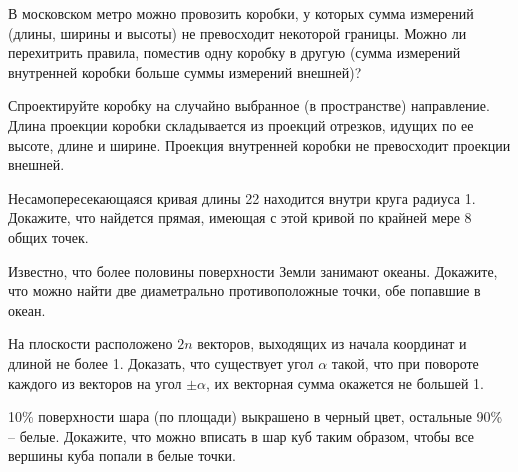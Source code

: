 \begin{problem}
В московском метро можно провозить коробки, у которых сумма измерений (длины, ширины и высоты) не превосходит некоторой границы. Можно ли перехитрить правила, поместив одну коробку в другую (сумма измерений внутренней коробки больше суммы измерений внешней)?
\end{problem}
\begin{ordre}
Спроектируйте коробку на случайно выбранное (в пространстве) 
направление. Длина проекции коробки складывается из проекций отрезков, 
идущих по ее высоте, длине и ширине. Проекция внутренней коробки не 
превосходит проекции внешней.
\end{ordre}

\begin{problem}
Несамопересекающаяся кривая длины 22 находится внутри круга радиуса 1. Докажите, что найдется прямая, имеющая с этой кривой по крайней мере 8 общих точек.
\end{problem}
\begin{problem}
Известно, что более половины поверхности Земли занимают океаны. Докажите, что можно найти две диаметрально противоположные точки, обе попавшие в океан.
\end{problem}


\begin{problem}
На плоскости расположено $2n$ векторов, выходящих из начала координат и длиной не более 1. Доказать, что существует угол $\alpha$ такой, что при повороте каждого из векторов на угол $\pm \alpha$, их векторная сумма окажется не большей 1.  
\end{problem}

\begin{problem} 10{\%} поверхности 
шара (по площади) выкрашено в черный цвет, остальные 90{\%} -- белые. 
Докажите, что можно вписать в шар куб таким образом, чтобы все вершины куба 
попали в белые точки.
\end{problem}

